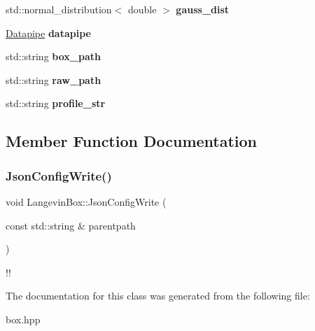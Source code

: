 \begin{DoxyCompactItemize}
\item 
\mbox{\label{classLangevinBox_a53ef6ddb921a69a841b41e30cd01952b}} 
std\+::normal\+\_\+distribution$<$ double $>$ {\bfseries gauss\+\_\+dist}
\item 
\mbox{\label{classLangevinBox_a0ebc87b152e617d95884e8b9d69d6c78}} 
\hyperlink{classDatapipe}{Datapipe} {\bfseries datapipe}
\item 
\mbox{\label{classLangevinBox_acda6cbc43769f145d6579d8cefb4ef70}} 
std\+::string {\bfseries box\+\_\+path}
\item 
\mbox{\label{classLangevinBox_a19db5865f02c02373d03cf728425e882}} 
std\+::string {\bfseries raw\+\_\+path}
\item 
\mbox{\label{classLangevinBox_aac0483078dbff9c405cd6054c204d197}} 
std\+::string {\bfseries profile\+\_\+str}
\end{DoxyCompactItemize}


\subsection{Member Function Documentation}
\mbox{\label{classLangevinBox_ae76bedc64a1feb6576a2b2f09242d40c}} 
\subsubsection{\texorpdfstring{Json\+Config\+Write()}{JsonConfigWrite()}}
{\footnotesize\ttfamily void Langevin\+Box\+::\+Json\+Config\+Write (\begin{DoxyParamCaption}\item[{const std\+::string \&}]{parentpath }\end{DoxyParamCaption})\hspace{0.3cm}{\ttfamily [inline]}}

!! 

The documentation for this class was generated from the following file\+:\begin{DoxyCompactItemize}
\item 
box.\+hpp\end{DoxyCompactItemize}
